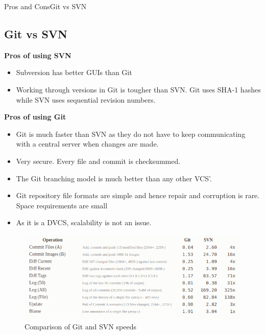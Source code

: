 \documentclass{beamer}
\begin{document}
\begin{frame}[allowframebreaks]{Pros and Cons}{Git vs SVN}
\subsection{Git vs SVN}

\textbf{Pros of using SVN}
\begin{itemize}
    \item Subversion has better GUIs than Git
    \item Working through versions in Git is tougher than SVN. Git uses SHA-1 hashes while SVN uses sequential revision numbers. 
\end{itemize}
\textbf{Pros of using Git}
\begin{itemize}
    \item Git is much faster than SVN as they do not have to keep communicating with a central server when changes are made.
    \item Very secure. Every file and commit is checksummed.
    \item The Git branching model is much better than any other VCS'.
    \item Git repository file formats are simple and hence  repair and corruption is rare. Space requirements are small
    \item As it is a DVCS, scalability is not an issue. 
\end{itemize}
\framebreak
\begin{figure}
	\includegraphics[scale=0.45]{images/better-git}
	\caption{Comparison of Git and SVN speeds\cite{better}}
\end{figure}

\end{frame}
\end{document}
